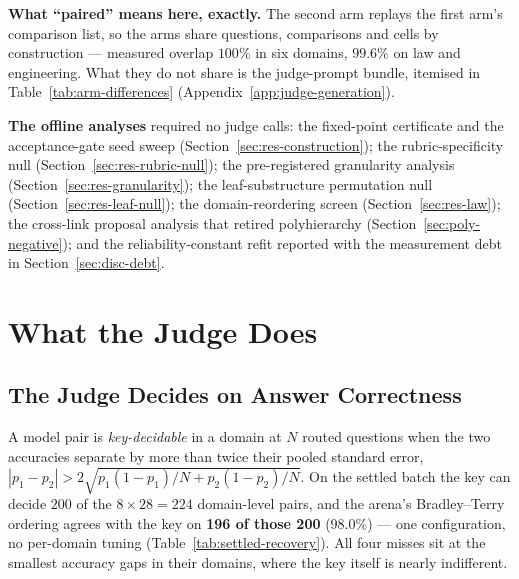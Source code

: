 \textbf{What ``paired'' means here, exactly.} The second arm replays
the first arm's comparison list, so the arms share questions,
comparisons and cells by construction --- measured overlap $100\%$ in
six domains, $99.6\%$ on law and engineering. What they do not share
is the judge-prompt bundle, itemised in
Table~\ref{tab:arm-differences}
(Appendix~\ref{app:judge-generation}).

\textbf{The offline analyses} required no judge calls: the fixed-point
certificate and the acceptance-gate seed sweep
(Section~\ref{sec:res-construction}); the rubric-specificity null
(Section~\ref{sec:res-rubric-null}); the pre-registered granularity
analysis (Section~\ref{sec:res-granularity}); the leaf-substructure
permutation null (Section~\ref{sec:res-leaf-null}); the
domain-reordering screen (Section~\ref{sec:res-law}); the cross-link
proposal analysis that retired polyhierarchy
(Section~\ref{sec:poly-negative}); and the reliability-constant refit
reported with the measurement debt in Section~\ref{sec:disc-debt}.

\section{What the Judge Does}\label{sec:res-judge}

\subsection{The Judge Decides on Answer Correctness}\label{sec:res-correctness}

A model pair is \emph{key-decidable} in a domain at
$N$ routed questions when the two accuracies separate by more than
twice their pooled standard error,
$|p_1 - p_2| > 2\sqrt{p_1(1-p_1)/N + p_2(1-p_2)/N}$. On the settled
batch the key can decide $200$ of the $8 \times 28 = 224$ domain-level
pairs, and the arena's Bradley--Terry ordering agrees with the key on
\textbf{196 of those 200} ($98.0\%$) --- one configuration, no
per-domain tuning (Table~\ref{tab:settled-recovery}). All four misses
sit at the smallest accuracy gaps in their domains, where the key
itself is nearly indifferent.

